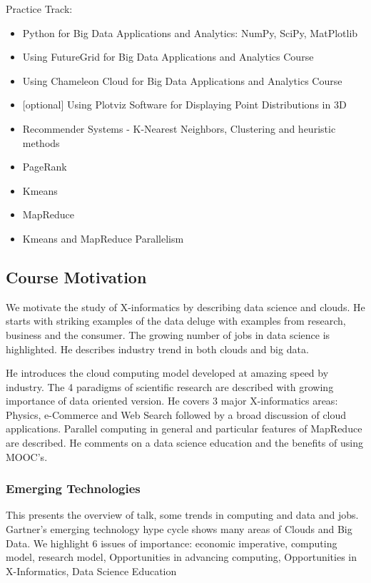Practice Track:

\begin{itemize}
\item
  Python for Big Data Applications and Analytics: NumPy, SciPy,
  MatPlotlib
\item
  Using FutureGrid for Big Data Applications and Analytics Course
\item
  Using Chameleon Cloud for Big Data Applications and Analytics Course
\item
  {[}optional{]} Using Plotviz Software for Displaying Point
  Distributions in 3D
\item
  Recommender Systems - K-Nearest Neighbors, Clustering and heuristic
  methods
\item
  PageRank
\item
  Kmeans
\item
  MapReduce
\item
  Kmeans and MapReduce Parallelism
\end{itemize}

\subsection{Course Motivation}\label{course-motivation}

We motivate the study of X-informatics by describing data science and
clouds. He starts with striking examples of the data deluge with
examples from research, business and the consumer. The growing number of
jobs in data science is highlighted. He describes industry trend in both
clouds and big data.

He introduces the cloud computing model developed at amazing speed by
industry. The 4 paradigms of scientific research are described with
growing importance of data oriented version. He covers 3 major
X-informatics areas: Physics, e-Commerce and Web Search followed by a
broad discussion of cloud applications. Parallel computing in general
and particular features of MapReduce are described. He comments on a
data science education and the benefits of using MOOC's.

\subsubsection{Emerging Technologies}\label{emerging-technologies}

This presents the overview of talk, some trends in computing and data
and jobs. Gartner's emerging technology hype cycle shows many areas of
Clouds and Big Data. We highlight 6 issues of importance: economic
imperative, computing model, research model, Opportunities in advancing
computing, Opportunities in X-Informatics, Data Science Education


